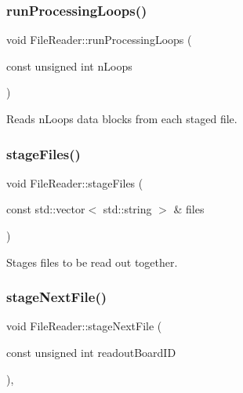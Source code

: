 \mbox{\label{class_file_reader_a478ed77f1b8f76e15cb2faa8964a26e6}} 
\subsubsection{\texorpdfstring{run\+Processing\+Loops()}{runProcessingLoops()}}
{\footnotesize\ttfamily void File\+Reader\+::run\+Processing\+Loops (\begin{DoxyParamCaption}\item[{const unsigned int}]{n\+Loops }\end{DoxyParamCaption})}



Reads n\+Loops data blocks from each staged file. 

\mbox{\label{class_file_reader_a5d487d37857d537ace41c31d6594ef3a}} 
\subsubsection{\texorpdfstring{stage\+Files()}{stageFiles()}}
{\footnotesize\ttfamily void File\+Reader\+::stage\+Files (\begin{DoxyParamCaption}\item[{const std\+::vector$<$ std\+::string $>$ \&}]{files }\end{DoxyParamCaption})}



Stages files to be read out together. 

\mbox{\label{class_file_reader_a381cceb460883f24a8113333ae1bf5bb}} 
\subsubsection{\texorpdfstring{stage\+Next\+File()}{stageNextFile()}}
{\footnotesize\ttfamily void File\+Reader\+::stage\+Next\+File (\begin{DoxyParamCaption}\item[{const unsigned int}]{readout\+Board\+ID }\end{DoxyParamCaption})\hspace{0.3cm}{\ttfamily [inline]}, {\ttfamily [private]}}



